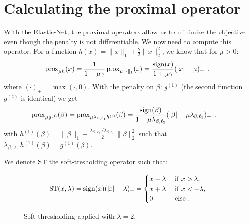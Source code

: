 \documentclass[../main.tex]{subfiles}
\begin{document}

\section{Calculating the proximal operator}

With the Elastic-Net, the proximal operators allow us to minimize the objective
even though the penalty is not differentiable.
We now need to compute this operator.
For a function $h(x)=\|x\|_1 + \frac{\gamma}{2}\|x\|_2^2$, we know
\citep[p.~189]{Parikh14} that for $\mu>0$:
\[
\operatorname{prox}_{\mu h}(x) = \dfrac{1}{1 + \mu\gamma}\operatorname{prox}_{\mu \|\cdot\|_1}(x) =
\dfrac{\operatorname{sign}(x)}{1 + \mu\gamma}(|x| - \mu)_+\enspace,
\]
where $(\cdot)_+=\max(\cdot, 0)$.
With the penalty on $\beta$: $g^{(1)}$
(the second function $g^{(2)}$ is identical) we get
\begin{align}\label{par:proxi}
	\operatorname{prox}_{\mu g^{(1)}}(\beta) &
	= \operatorname{prox}_{\mu\lambda_{\beta, \ell_1}{h^{(1)}}}(\beta)
	= \dfrac{\operatorname{sign}(\beta)}{1 + \mu \lambda_{\beta,\ell_2}}(|\beta|
	-\mu\lambda_{\beta, \ell_1})_+\enspace,
\end{align}
with ${h^{(1)}}(\beta) = \|\beta\|_1 + \frac{\lambda_{\beta, \ell_2} /
 \lambda_{\beta, \ell_1}}{2} \|\beta\|_2^2$
such that $ \lambda_{\beta, \ell_1}{h^{(1)}}(\beta) = g^{(1)}(\beta)$.

\begin{definition}
We denote $\mathrm{ST}$ the soft-tresholding operator such that:

\[\mathrm{ST}(x, \lambda) = \operatorname{sign}(x)(|x| - \lambda)_+ = \begin{cases} x- \lambda & \text{ if } x>\lambda,\\
										  x + \lambda & \text { if } x < -\lambda,\\
										  0 & \text{ else }. \end{cases}
										  \]

\begin{figure}[ht]
	\centering
{}
	\caption{Soft-thresholding applied with $\lambda=2$.}
\end{figure}
\end{definition}
\end{document}
